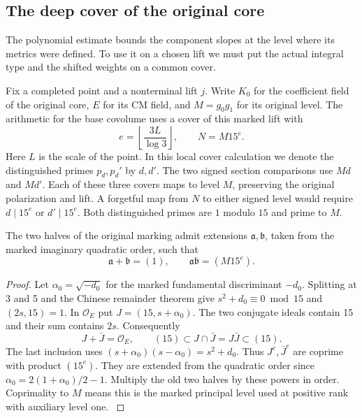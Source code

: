 \subsection{The deep cover of the original core}
\label{subsec:deep-cover-on-core}

The polynomial estimate bounds the component slopes at the level where its metrics were defined. To use it on a chosen lift we must put the actual integral type and the shifted weights on a common cover.

Fix a completed point and a nonterminal lift \(j\). Write \(K_0\)
for the coefficient field of the original core, \(E\) for its
CM field, and \(M=g_0g_1\) for its original level. The arithmetic
for the base covolume uses a cover of this marked lift with
\[
 e=\left\lfloor\frac{3L}{\log 3}\right\rfloor,\qquad N=M15^e .
\]
Here \(L\) is the scale of the point. In this local cover calculation
we denote the distinguished primes \(p_d,p_d'\) by \(d,d'\).
The two signed section comparisons use \(Md\) and \(Md'\). Each of these three covers
maps to level \(M\), preserving the original polarization
and lift. A forgetful map from \(N\) to either signed level
would require \(d\mid15^e\) or \(d'\mid15^e\). Both distinguished
primes are \(1\) modulo \(15\) and prime to \(M\).
\label{cor:deep-cover-on-core-1}

\begin{lemma}
The two halves of the original marking admit extensions \(\mathfrak a,\mathfrak b\), taken from the marked imaginary quadratic order, such that
\[
 \mathfrak a+\mathfrak b=(1),\qquad \mathfrak a\mathfrak b=(M15^e).
\]

\end{lemma}
\begin{proof}
Let \(\alpha_0=\sqrt{-d_0}\) for the marked fundamental
discriminant \(-d_0\). Splitting at 3 and 5 and the Chinese
remainder theorem give \(s^2+d_0\equiv0\bmod15\) and \((2s,15)=1\).
In \(\mathcal O_E\) put \(J=(15,s+\alpha_0)\). The two conjugate
ideals contain 15 and their sum contains \(2s\). Consequently
\[
 J+\bar J=\mathcal O_E,\qquad
 (15)\subset J\cap\bar J=J\bar J\subset(15).
\]
The last inclusion uses \((s+\alpha_0)(s-\alpha_0)=s^2+d_0\).
Thus \(J^e,\bar J^e\) are coprime with product \((15^e)\).
They are extended from the quadratic order since
\(\alpha_0=2(1+\alpha_0)/2-1\). Multiply the old two halves by
these powers in order. Coprimality to \(M\) means this is the
marked principal level used at positive rank with auxiliary
level one. \label{cor:deep-cover-on-core-2}
\end{proof}

